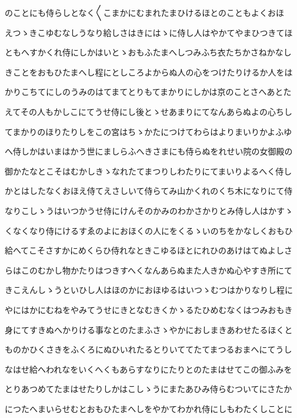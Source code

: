 \documentclass[a4paper,11pt,landscape]{ltjtarticle}
\begin{document}
\par\medskip
のことにも侍らしとなく〱こまかにむまれたまひけるほとのこともよくおほ
\par\medskip
えつゝきこゆむなしうなり給しさはきにはゝに侍し人はやかてやまひつきてほ
\par\medskip
ともへすかくれ侍にしかはいとゝおもふたまへしつみふち衣たちかさねかなし
\par\medskip
きことをおもひたまへし程にとしころよからぬ人の心をつけたりけるか人をは
\par\medskip
かりこちてにしのうみのはてまてとりもてまかりにしかは京のことさへあとた
\par\medskip
えてその人もかしこにてうせ侍にし後とゝせあまりにてなんあらぬよの心ちし
\par\medskip
てまかりのほりたりしをこの宮はちゝかたにつけてわらはよりまいりかよふゆ
\par\medskip
へ侍しかはいまはかう世にましらふへきさまにも侍らぬをれせい院の女御殿の
\par\medskip
御かたなとこそはむかしきゝなれたてまつりしわたりにてまいりよるへく侍し
\par\medskip
かとはしたなくおほえ侍てえさしいて侍らてみ山かくれのくち木になりにて侍
\par\medskip
なりこしゝうはいつかうせ侍にけんそのかみのわかさかりとみ侍し人はかすゝ
\par\medskip
くなくなり侍にけるすゑのよにおほくの人にをくるゝいのちをかなしくおもひ
\par\medskip
給へてこそさすかにめくらひ侍れなときこゆるほとにれひのあけはてぬよしさ
\par\medskip
らはこのむかし物かたりはつきすへくなんあらぬまた人きかぬ心やすき所にて
\par\medskip
きこえんしゝうといひし人はほのかにおほゆるはいつゝむつはかりなりし程に
\par\medskip
やにはかにむねをやみてうせにきとなむきくかゝるたひめむなくはつみおもき
\par\medskip
身にてすきぬへかりける事なとのたまふさゝやかにおしまきあわせたるほくと
\par\medskip
ものかひくさきをふくろにぬひいれたるとりいててたてまつるおまへにてうし
\par\medskip
なはせ給へわれなをいくへくもあらすなりにたりとのたまはせてこの御ふみを
\par\medskip
とりあつめてたまはせたりしかはこしゝうにまたあひみ侍らむついてにさたか
\par\medskip
につたへまいらせむとおもひたまへしをやかてわかれ侍にしもわたくしことに
\end{document}
